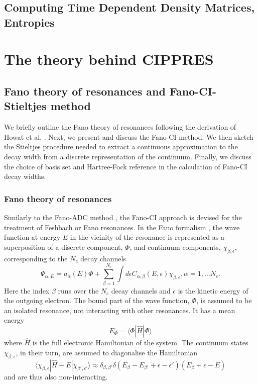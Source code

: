 \documentclass[a4paper, 10 pt]{report}
\begin{document}
\section{Computing Time Dependent Density Matrices, Entropies}
\newpage

\chapter{The theory behind CIPPRES}

\section{Fano theory of resonances and Fano-CI-Stieltjes method}

We briefly outline the Fano theory of resonances following the 
derivation of Howat et al. \cite{Howat78:1575}. Next, we present and discuss 
the Fano-CI method. We then sketch the Stieltjes procedure needed to extract a 
continuous approximation to the decay width from a discrete representation of 
the continuum. Finally, we discuss the choice of basis set and Hartree-Fock 
reference in the calculation of Fano-CI decay widths.

\subsection{Fano theory of resonances}

Similarly to the Fano-ADC method \cite{Averbukh05:204107}, the Fano-CI approach 
is devised for the treatment of Feshbach or Fano resonances. In the Fano 
formalism \cite{Fano61:1866,Howat78:1575}, the wave function at energy $E$ in 
the vicinity of the resonance is represented as a superposition of a discrete 
component, $\Phi$, and continuum components, $\chi_{\beta, \epsilon}$, 
corresponding to the $N_{c}$ decay channels
%
\begin{equation}\label{eq:psi_fano}
\Psi_{\alpha, E} = a_{\alpha}(E) \Phi + \sum_{\beta = 1}^{N_{c}}\int d\epsilon C_{\alpha,\beta} (E,\epsilon) \chi_{\beta, \epsilon}, \alpha = 1, \dots N_{c}.
\end{equation}
%
Here the index $\beta$ runs over the $N_{c}$ decay channels and $\epsilon$ is 
the kinetic energy of the outgoing electron. The bound part of the wave 
function, $\Phi$, is assumed to be an isolated resonance, not interacting with 
other resonances. It has a mean energy
%
\begin{equation}\label{eq:E_phi}
E_{\Phi} = \langle\Phi | \hat{H} | \Phi\rangle
\end{equation}
%
where $\hat{H}$ is the full electronic Hamiltonian of the system. The continuum 
states $\chi_{\beta, \epsilon}$, in their turn, are assumed to diagonalise the 
Hamiltonian
%
\begin{equation}\label{eq:chi_orthog}
\langle\chi_{\beta,\epsilon} | \hat{H} - E | \chi_{\beta', \epsilon'} \rangle \approx \delta_{\beta, \beta'} \delta(E_{\beta} - E_{\beta'} + \epsilon - \epsilon') (E_{\beta} + \epsilon - E)
\end{equation}
%
and are thus also non-interacting.
\end{document}
